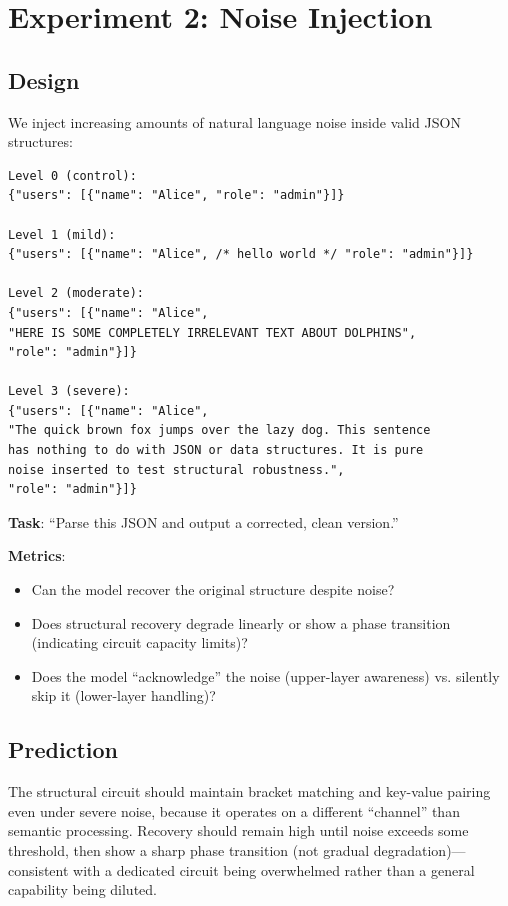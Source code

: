 \documentclass[11pt,a4paper]{article}
\begin{document}
\section{Experiment 2: Noise Injection}

\subsection{Design}

We inject increasing amounts of natural language noise inside valid JSON structures:

\begin{lstlisting}
Level 0 (control):
{"users": [{"name": "Alice", "role": "admin"}]}

Level 1 (mild):
{"users": [{"name": "Alice", /* hello world */ "role": "admin"}]}

Level 2 (moderate):
{"users": [{"name": "Alice",
"HERE IS SOME COMPLETELY IRRELEVANT TEXT ABOUT DOLPHINS",
"role": "admin"}]}

Level 3 (severe):
{"users": [{"name": "Alice",
"The quick brown fox jumps over the lazy dog. This sentence
has nothing to do with JSON or data structures. It is pure
noise inserted to test structural robustness.",
"role": "admin"}]}
\end{lstlisting}

\textbf{Task}: ``Parse this JSON and output a corrected, clean version.''

\textbf{Metrics}:
\begin{itemize}
    \item Can the model recover the original structure despite noise?
    \item Does structural recovery degrade linearly or show a phase transition (indicating circuit capacity limits)?
    \item Does the model ``acknowledge'' the noise (upper-layer awareness) vs. silently skip it (lower-layer handling)?
\end{itemize}

\subsection{Prediction}

The structural circuit should maintain bracket matching and key-value pairing even under severe noise, because it operates on a different ``channel'' than semantic processing. Recovery should remain high until noise exceeds some threshold, then show a sharp phase transition (not gradual degradation)---consistent with a dedicated circuit being overwhelmed rather than a general capability being diluted.
\end{document}
